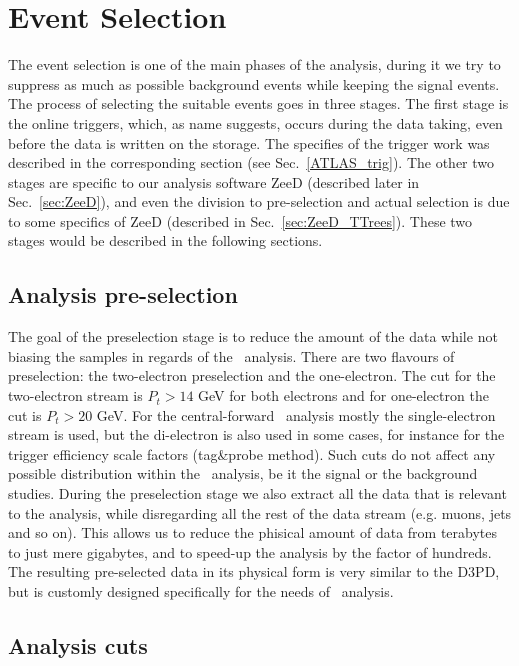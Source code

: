 \chapter{Event Selection}
\label{sec:Selection}

The event selection is one of the main phases of the analysis, during it we try to suppress as much as possible background events while keeping the signal events. The process of selecting the suitable events goes in three stages. The first stage is the online triggers, which, as name suggests, occurs during the data taking, even before the data is written on the storage. The specifies of the trigger work was described in the corresponding section (see Sec.~\ref{ATLAS_trig}). The other two stages are specific to our analysis software ZeeD (described later in Sec.~\ref{sec:ZeeD}), and even the division to pre-selection and actual selection is due to some specifics of ZeeD (described in Sec.~\ref{sec:ZeeD_TTrees}). These two stages would be described in the following sections.

\section{Analysis pre-selection}
\label{sec:Sel_pre-sel}

The goal of the preselection stage is to reduce the amount of the data while not biasing the samples in regards of the \Zee\ analysis. There are two flavours of preselection: the two-electron preselection and the one-electron. The cut for the two-electron stream is $P_{t} > 14$ GeV for both electrons and for one-electron the cut is $P_{t} > 20$ GeV. For the central-forward \Zee\ analysis mostly the single-electron stream is used, but the di-electron is also used in some cases, for instance for the trigger efficiency scale factors (tag\&probe method). Such cuts do not affect any possible distribution within the \Zee\ analysis, be it the signal or the background studies. During the preselection stage we also extract all the data that is relevant to the analysis, while disregarding all the rest of the data stream (e.g. muons, jets and so on). This allows us to reduce the phisical amount of data from terabytes to just mere gigabytes, and to speed-up the analysis by the factor of hundreds. The resulting pre-selected data in its physical form is very similar to the D3PD, but is customly designed specifically for the needs of \Zee\ analysis.

\section{Analysis cuts}
\label{sec:Sel_cuts}

